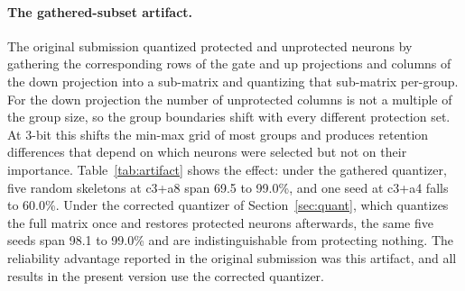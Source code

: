 \documentclass[11pt]{article}
\begin{document}
\paragraph{The gathered-subset artifact.}
The original submission quantized protected and unprotected 
neurons by gathering the corresponding rows of the gate and up 
projections and columns of the down projection into a 
sub-matrix and quantizing that sub-matrix per-group. For the 
down projection the number of unprotected columns is not a 
multiple of the group size, so the group boundaries shift with 
every different protection set. At 3-bit this shifts the 
min-max grid of most groups and produces retention differences 
that depend on which neurons were selected but not on their 
importance. Table~\ref{tab:artifact} shows the effect: under 
the gathered quantizer, five random skeletons at c3+a8 span 
69.5 to 99.0\%, and one seed at c3+a4 falls to 60.0\%. Under 
the corrected quantizer of Section~\ref{sec:quant}, which 
quantizes the full matrix once and restores protected neurons 
afterwards, the same five seeds span 98.1 to 99.0\% and are 
indistinguishable from protecting nothing. The reliability 
advantage reported in the original submission was this 
artifact, and all results in the present version use the 
corrected quantizer.

\begin{table}[t]
\centering
\small
{}
\caption{Retention on Gemma-2-2B ($n{=}105$) under the 
gathered-subset quantizer of the original submission and the 
aligned protect-by-restore quantizer used throughout this 
version. Random rows report mean and standard deviation over 
seeds (five gathered; five and three aligned for c3+a8 and 
c3+a4). Selection-dependent variance disappears once the 
grouping is held fixed.}
\label{tab:artifact}
\end{table}
\end{document}
